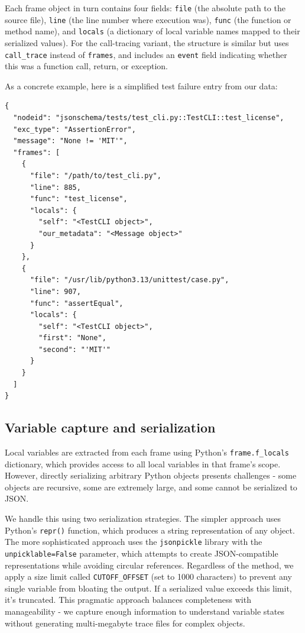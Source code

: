 Each frame object in turn contains four fields: \texttt{file} (the absolute path to the source file), \texttt{line} (the line number where execution was), \texttt{func} (the function or method name), and \texttt{locals} (a dictionary of local variable names mapped to their serialized values). For the call-tracing variant, the structure is similar but uses \texttt{call\_trace} instead of \texttt{frames}, and includes an \texttt{event} field indicating whether this was a function call, return, or exception.

As a concrete example, here is a simplified test failure entry from our data:

\begin{verbatim}
{
  "nodeid": "jsonschema/tests/test_cli.py::TestCLI::test_license",
  "exc_type": "AssertionError",
  "message": "None != 'MIT'",
  "frames": [
    {
      "file": "/path/to/test_cli.py",
      "line": 885,
      "func": "test_license",
      "locals": {
        "self": "<TestCLI object>",
        "our_metadata": "<Message object>"
      }
    },
    {
      "file": "/usr/lib/python3.13/unittest/case.py",
      "line": 907,
      "func": "assertEqual",
      "locals": {
        "self": "<TestCLI object>",
        "first": "None",
        "second": "'MIT'"
      }
    }
  ]
}
\end{verbatim}

\subsection{Variable capture and serialization}

Local variables are extracted from each frame using Python's \texttt{frame.f\_locals} dictionary, which provides access to all local variables in that frame's scope. However, directly serializing arbitrary Python objects presents challenges - some objects are recursive, some are extremely large, and some cannot be serialized to JSON.

We handle this using two serialization strategies. The simpler approach uses Python's \texttt{repr()} function, which produces a string representation of any object. The more sophisticated approach uses the \texttt{jsonpickle} library with the \texttt{unpicklable=False} parameter, which attempts to create JSON-compatible representations while avoiding circular references. Regardless of the method, we apply a size limit called \texttt{CUTOFF\_OFFSET} (set to 1000 characters) to prevent any single variable from bloating the output. If a serialized value exceeds this limit, it's truncated. This pragmatic approach balances completeness with manageability - we capture enough information to understand variable states without generating multi-megabyte trace files for complex objects.


